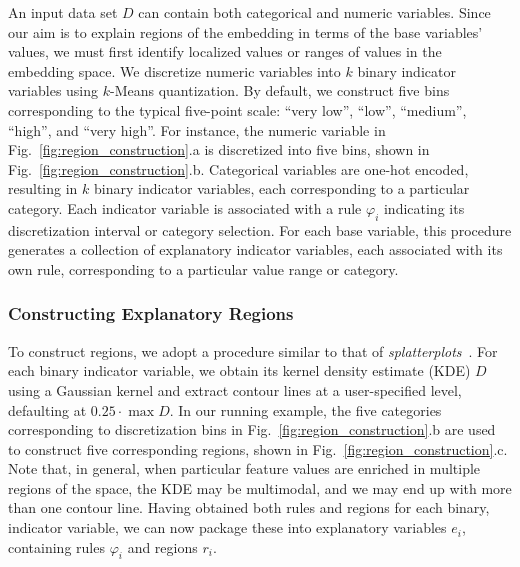 \documentclass[lettersize,journal]{IEEEtran}
\begin{document}
An input data set $D$ can contain both categorical and numeric variables. Since our aim is to explain regions of the embedding in terms of the base variables' values, we must first identify localized values or ranges of values in the embedding space.
We discretize numeric variables into $k$ binary indicator variables using $k$-Means quantization. By default, we construct five bins corresponding to the typical five-point scale: ``very low'', ``low'', ``medium'', ``high'', and ``very high''. For instance, the numeric variable in Fig.~\ref{fig:region_construction}.a is discretized into five bins, shown in Fig.~\ref{fig:region_construction}.b. Categorical variables are one-hot encoded, resulting in $k$ binary indicator variables, each corresponding to a particular category. Each indicator variable is associated with a rule $\varphi_i$ indicating its discretization interval or category selection. For each base variable, this procedure generates a collection of explanatory indicator variables, each associated with its own rule, corresponding to a particular value range or category.

\subsubsection{Constructing Explanatory Regions}

To construct regions, we adopt a procedure similar to that of \textit{splatterplots}~\cite{MayorgaGleicher2013}. For each binary indicator variable, we obtain its kernel density estimate (KDE) $D$ using a Gaussian kernel and extract contour lines at a user-specified level, defaulting at $0.25 \cdot \max D$.
In our running example, the five categories corresponding to discretization bins in Fig.~\ref{fig:region_construction}.b are used to construct five corresponding regions, shown in Fig.~\ref{fig:region_construction}.c.
Note that, in general, when particular feature values are enriched in multiple regions of the space, the KDE may be multimodal, and we may end up with more than one contour line.
Having obtained both rules and regions for each binary, indicator variable, we can now package these into explanatory variables $e_i$, containing rules $\varphi_i$ and regions $r_i$.
\end{document}

